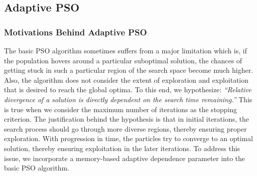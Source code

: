 \documentclass[final,3p,times]{elsarticle}
\begin{document}
\subsection{Adaptive PSO}
\subsubsection{Motivations Behind Adaptive PSO}
The basic PSO algorithm sometimes suffers from a major limitation which {is,} if the population hovers around a particular {suboptimal} solution, the chances of getting stuck in such a particular region of the search space become much higher. Also, the algorithm does not consider the extent of exploration and exploitation that is {desired} to reach the global optima. To this end, we hypothesize: \textit{“Relative divergence of a solution is directly dependent on the search time remaining.”} This is true when we consider the maximum number of iterations as the stopping criterion. {The justification behind the hypothesis is that in initial iterations, the search process should go through more diverse regions, thereby ensuring proper exploration. With progression in time, the particles try to converge to an optimal solution, thereby ensuring exploitation in the later iterations. To address this issue, we incorporate a memory-based adaptive dependence parameter into the basic PSO algorithm.}\\
\end{document}
